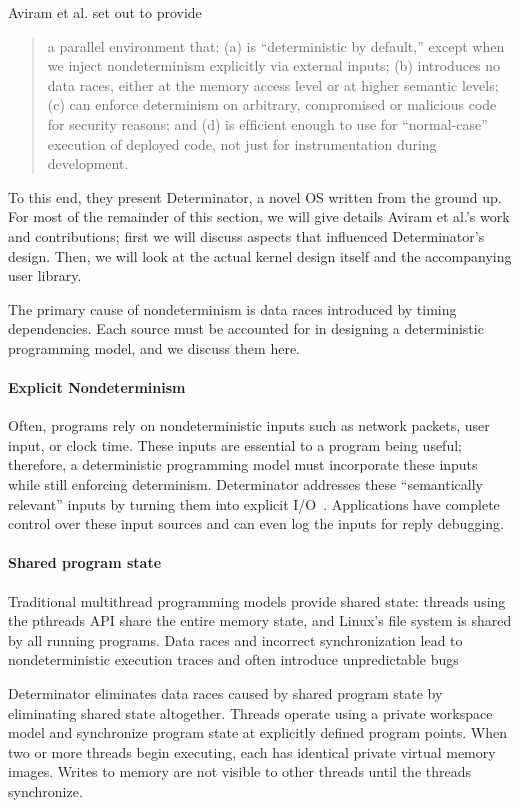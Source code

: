 Aviram et al. set out to provide
\begin{quote}
a parallel environment that:
(a) is ``deterministic by default,'' except when
we inject nondeterminism explicitly via external inputs;
(b) introduces no data races, either at the memory access level
or at higher semantic levels; (c)
can enforce determinism on arbitrary, compromised or
malicious code for security reasons; and (d) is efﬁcient
enough to use for ``normal-case'' execution of deployed
code, not just for instrumentation during development. \cite{Aviram10}
\end{quote}

To this end, they present Determinator, a novel OS written from the ground up.
For most of the remainder of this section, we will give details Aviram et al.'s
work and contributions; first we will discuss aspects that influenced
Determinator's design. Then, we will look at the actual kernel design itself
and the accompanying user library.

The primary cause of nondeterminism is data races introduced by timing
dependencies. Each source must be accounted for in designing a deterministic
programming model, and we discuss them here.

\paragraph{Explicit Nondeterminism}
Often, programs rely on nondeterministic inputs such as network packets, user
input, or clock time. These inputs are essential to a program being useful;
therefore, a deterministic programming model must incorporate these inputs while
still enforcing determinism. Determinator addresses these ``semantically
relevant'' inputs by turning them into explicit I/O~\cite{Aviram10}.
Applications have complete control over these input sources and can even log the
inputs for reply debugging.

\paragraph{Shared program state}
Traditional multithread programming models provide shared state: threads using
the pthreads API share the entire memory state, and Linux's file system is
shared by all running programs. Data races and incorrect synchronization lead
to nondeterministic execution traces and often introduce unpredictable bugs

Determinator eliminates data races caused by shared program state by eliminating
shared state altogether. Threads operate using a private workspace model and
synchronize program state at explicitly defined program points. When two or more
threads begin executing, each has identical private virtual memory images.
Writes to memory are not visible to other threads until the threads synchronize.

